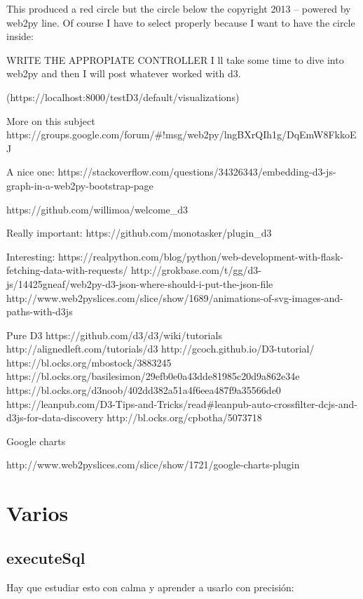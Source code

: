 \documentclass[12pt,spanish,]{article}
\begin{document}
This produced a red circle but the circle below the copyright 2013 --
powered by web2py line. Of course I have to select properly because I
want to have the circle inside:

WRITE THE APPROPIATE CONTROLLER I ll take some time to dive into web2py
and then I will post whatever worked with d3.

(https://localhost:8000/testD3/default/visualizations)

More on this subject
https://groups.google.com/forum/\#!msg/web2py/lngBXrQIh1g/DqEmW8FkkoEJ

A nice one:
https://stackoverflow.com/questions/34326343/embedding-d3-js-graph-in-a-web2py-bootstrap-page

https://github.com/willimoa/welcome\_d3

Really important: https://github.com/monotasker/plugin\_d3

Interesting:
https://realpython.com/blog/python/web-development-with-flask-fetching-data-with-requests/
http://grokbase.com/t/gg/d3-js/14425gneaf/web2py-d3-json-where-should-i-put-the-json-file
http://www.web2pyslices.com/slice/show/1689/animations-of-svg-images-and-paths-with-d3js

Pure D3 https://github.com/d3/d3/wiki/tutorials
http://alignedleft.com/tutorials/d3 http://gcoch.github.io/D3-tutorial/
https://bl.ocks.org/mbostock/3883245
https://bl.ocks.org/basilesimon/29efb0e0a43dde81985c20d9a862e34e
https://bl.ocks.org/d3noob/402dd382a51a4f6eea487f9a35566de0
https://leanpub.com/D3-Tips-and-Tricks/read\#leanpub-auto-crossfilter-dcjs-and-d3js-for-data-discovery
http://bl.ocks.org/cpbotha/5073718

Google charts

http://www.web2pyslices.com/slice/show/1721/google-charts-plugin

\hypertarget{varios}{%
\section{Varios}\label{varios}}

\hypertarget{executesql}{%
\subsection{executeSql}\label{executesql}}

Hay que estudiar esto con calma y aprender a usarlo con precisión:
\end{document}
